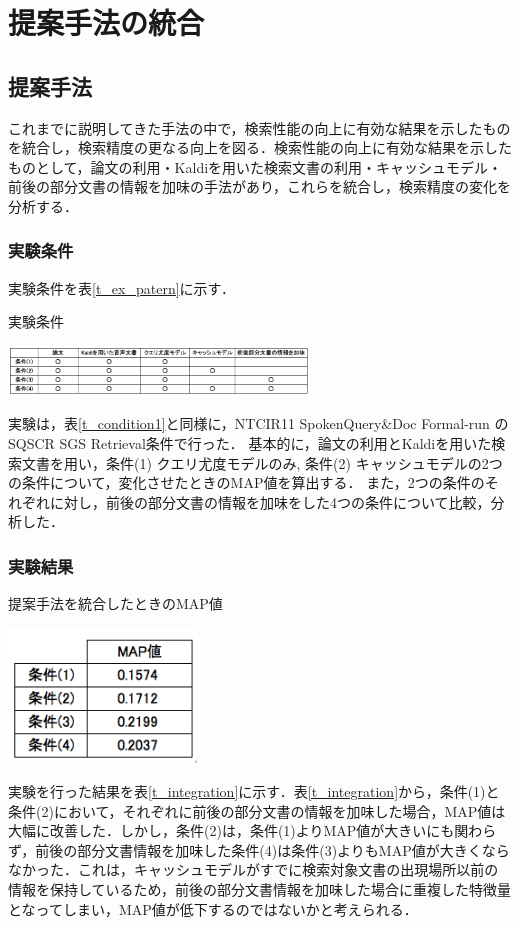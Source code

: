 \chapter{提案手法の統合}

\section{提案手法}

これまでに説明してきた手法の中で，検索性能の向上に有効な結果を示したものを統合し，検索精度の更なる向上を図る．検索性能の向上に有効な結果を示したものとして，論文の利用・Kaldiを用いた検索文書の利用・キャッシュモデル・前後の部分文書の情報を加味の手法があり，これらを統合し，検索精度の変化を分析する．

\subsection{実験条件}
実験条件を表\ref{t_ex_patern}に示す．

\begin{table}[h]
    \centering
    \caption{実験条件}
    \includegraphics[width=8cm]{./image/t_ex_patern2.png}
    \label{t_ex_patern}
\end{table}
実験は，表\ref{t_condition1}と同様に，NTCIR11 SpokenQuery\&Doc Formal-run の SQSCR SGS Retrieval条件で行った．
基本的に，論文の利用とKaldiを用いた検索文書を用い，条件(1) クエリ尤度モデルのみ, 条件(2) キャッシュモデルの2つの条件について，変化させたときのMAP値を算出する．
また，2つの条件のそれぞれに対し，前後の部分文書の情報を加味をした4つの条件について比較，分析した．

\subsection{実験結果}

\begin{table}[htbp]
    \centering
    \caption{提案手法を統合したときのMAP値}
    \includegraphics[width=5cm]{./image/t_integration4.png}
    \label{t_integration}
\end{table}

実験を行った結果を表\ref{t_integration}に示す．表\ref{t_integration}から，条件(1)と条件(2)において，それぞれに前後の部分文書の情報を加味した場合，MAP値は大幅に改善した．しかし，条件(2)は，条件(1)よりMAP値が大きいにも関わらず，前後の部分文書情報を加味した条件(4)は条件(3)よりもMAP値が大きくならなかった．これは，キャッシュモデルがすでに検索対象文書の出現場所以前の情報を保持しているため，前後の部分文書情報を加味した場合に重複した特徴量となってしまい，MAP値が低下するのではないかと考えられる．

